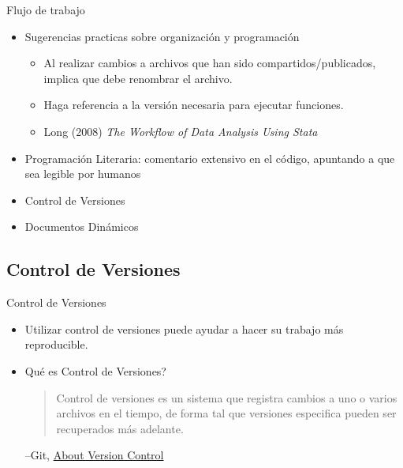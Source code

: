 \documentclass{beamer}
\begin{document}
\begin{frame}{Flujo de trabajo}

 \begin{itemize}
 \item Sugerencias practicas sobre organización y programación
 \begin{itemize}[<.->]
 	\item Al realizar cambios a archivos que han sido compartidos/publicados, implica que debe renombrar el archivo.
 	\item Haga referencia a la versión necesaria para ejecutar funciones.
 	\item Long (2008) \textit{The Workflow of Data Analysis Using Stata}
  \end{itemize}
 \item Programación Literaria: comentario extensivo en el código, apuntando a que sea legible por humanos
 \item Control de Versiones
 \item Documentos Dinámicos
\end{itemize}
\end{frame}

\subsection*{Control de Versiones}
\begin{frame}{Control de Versiones}
\begin{itemize}[<.->]
\item
Utilizar control de versiones puede ayudar a hacer su trabajo más reproducible.

\item
Qué es Control de Versiones?

\begin{quote}
Control de versiones es un sistema que registra cambios a uno o varios archivos en el tiempo, de forma tal que versiones especifica pueden ser recuperados más adelante.
\end{quote}
--Git, \href{https://git-scm.com/book/en/v2/Getting-Started-About-Version-Control}{About Version Control}
\end{itemize}
\end{frame}
\end{document}
